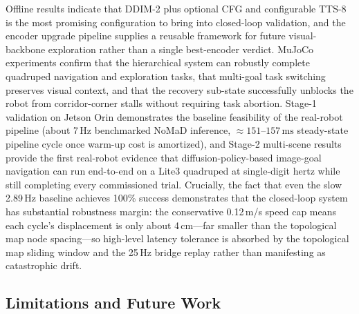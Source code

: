 \begin{digest}[en]
Offline results indicate that DDIM-2 plus optional CFG and configurable TTS-8 is the
most promising configuration to bring into closed-loop validation, and the encoder
upgrade pipeline supplies a reusable framework for future visual-backbone exploration
rather than a single best-encoder verdict. MuJoCo experiments confirm that the
hierarchical system can robustly complete quadruped navigation and exploration tasks,
that multi-goal task switching preserves visual context, and that the recovery
sub-state successfully unblocks the robot from corridor-corner stalls without
requiring task abortion. Stage-1 validation on Jetson Orin demonstrates the baseline
feasibility of the real-robot pipeline (about 7\,Hz benchmarked NoMaD inference,
$\approx 151$--$157\,\mathrm{ms}$ steady-state pipeline cycle once warm-up cost is
amortized), and Stage-2 multi-scene results provide the first real-robot evidence
that diffusion-policy-based image-goal navigation can run end-to-end on a Lite3
quadruped at single-digit hertz while still completing every commissioned trial.
Crucially, the fact that even the slow 2.89\,Hz baseline achieves 100\% success
demonstrates that the closed-loop system has substantial robustness margin: the
conservative 0.12\,m/s speed cap means each cycle's displacement is only about
4\,cm---far smaller than the topological map node spacing---so high-level latency tolerance is
absorbed by the topological map sliding window and the 25\,Hz bridge replay rather than
manifesting as catastrophic drift.

\subsection*{Limitations and Future Work}


\end{digest}
